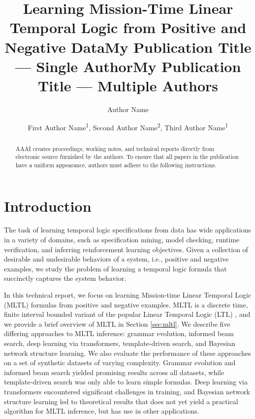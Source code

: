 \documentclass[letterpaper]{article} %
\title{Learning Mission-Time Linear Temporal Logic from Positive and Negative Data}
\title{My Publication Title --- Single Author}
\author {
    Author Name
}
\title{My Publication Title --- Multiple Authors}
\author {
    First Author Name\textsuperscript{\rm 1},
    Second Author Name\textsuperscript{\rm 2},
    Third Author Name\textsuperscript{\rm 1}
}
\begin{document}

\maketitle

\begin{abstract}
AAAI creates proceedings, working notes, and technical reports directly from electronic source furnished by the authors. To ensure that all papers in the publication have a uniform appearance, authors must adhere to the following instructions.
\end{abstract}


\section{Introduction}
\label{sec:intro}

The task of learning temporal logic specifications from data has wide applications in a variety of domains, such as specification mining, model checking, runtime verification, and inferring reinforcement learning objectives. 
Given a collection of desirable and undesirable behaviors of a system, i.e., positive and negative examples, we study the problem of learning a temporal logic formula that succinctly captures the system behavior.

In this technical report, we focus on learning Mission-time Linear Temporal Logic (MLTL) formulas from positive and negative examples.
MLTL is a discrete time, finite interval bounded variant of the popular Linear Temporal Logic (LTL) \cite{Pnueli77}, and we provide a brief overview of MLTL in Section \ref{sec:mltl}.
We describe five differing approaches to MLTL inference: grammar evolution, informed beam search, deep learning via transformers, template-driven search, and Bayesian network structure learning.
We also evaluate the performance of these approaches on a set of synthetic datasets of varying complexity.
Grammar evolution and informed beam search yielded promising results across all datasets, while template-driven search was only able to learn simple formulas.
Deep learning via transformers encountered significant challenges in training, and Bayesian network structure learning led to theoretical results that does not yet yield a practical algorithm for MLTL inference, but has use in other applications.
\end{document}
